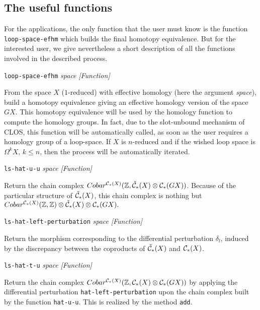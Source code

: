 \subsection {The useful functions}

For the applications, the only function that the user must know is the function {\tt loop-space-efhm}
which builds the final homotopy equivalence. But for the
interested user, we give nevertheless a short description of all the functions
involved in the described process.

\vskip 0.30cm
{\parindent=0mm
{\leftskip=5mm
{\tt loop-space-efhm} {\em space}  \hfill {\em [Function]} \par}
{\leftskip=15mm
From the space $X$ ($1$-reduced) with effective homology (here the argument {\em space}), build
a homotopy equivalence giving an effective homology version  of the space $GX$. This homotopy
equivalence will be used by the homology function to compute the homology groups. In fact, due to
the slot-unbound mechanism of CLOS, this function will be automatically called, as soon
as the user requires a homology group of a loop-space.
If $X$ is $n$-reduced and if the wished loop space is $\Omega^k X, \, k \leq n$, then
the process will be automatically  iterated. \par}
{\leftskip=5mm
{\tt ls-hat-u-u} {\em space}  \hfill {\em [Function]} \par}
{\leftskip=15mm
Return the chain complex
$Cobar^{{\cal C}_*(X)}({\mathbb{Z}}, {\check{\cal C}}_*(X)\otimes {\cal C_*}(GX))$. Because of
the particular structure of ${\check{\cal C}}_*(X)$, this chain complex is nothing but
$Cobar^{{\cal C}_*(X)}({\mathbb{Z}},{\mathbb{Z}})\otimes {\check{\cal C}}_*(X)\otimes {\cal C_*}(GX).$
\par}
{\leftskip=5mm
{\tt ls-hat-left-perturbation} {\em space}  \hfill {\em [Function]} \par}
{\leftskip=15mm
Return the morphism corresponding to the differential perturbation $\delta_l$, induced by
the discrepancy between the coproducts of  ${\check{\cal C}}_*(X)$ and ${\cal C}_*(X)$. \par}
{\leftskip=5mm
{\tt ls-hat-t-u} {\em space}  \hfill {\em [Function]} \par}
{\leftskip=15mm
Return the chain complex
$Cobar^{{\cal C}_*(X)}({\mathbb{Z}}, {\cal C}_*(X)\otimes {\cal C_*}(GX))$ by applying
the differential perturbation {\tt hat-left-perturbation} upon
the chain complex built by the function {\tt hat-u-u}. This is realized by the method
{\tt add}. \par}
{\leftskip=5mm
}}
